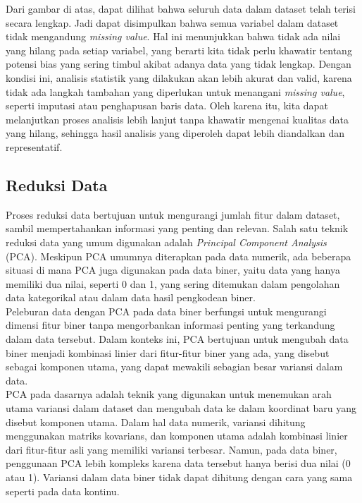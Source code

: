 \documentclass[english,12pt,a4paper,openany]{book}
\begin{document}
	Dari gambar di atas, dapat dilihat bahwa seluruh data dalam dataset telah terisi secara lengkap. Jadi dapat disimpulkan bahwa semua variabel dalam dataset tidak mengandung \textit{missing value}. Hal ini menunjukkan bahwa tidak ada nilai yang hilang pada setiap variabel, yang berarti kita tidak perlu khawatir tentang potensi bias yang sering timbul akibat adanya data yang tidak lengkap. Dengan kondisi ini, analisis statistik yang dilakukan akan lebih akurat dan valid, karena tidak ada langkah tambahan yang diperlukan untuk menangani \textit{missing value}, seperti imputasi atau penghapusan baris data. Oleh karena itu, kita dapat melanjutkan proses analisis lebih lanjut tanpa khawatir mengenai kualitas data yang hilang, sehingga hasil analisis yang diperoleh dapat lebih diandalkan dan representatif.
	
	
	\subsection{Reduksi Data}
	Proses reduksi data bertujuan untuk mengurangi jumlah fitur dalam dataset, sambil mempertahankan informasi yang penting dan relevan. Salah satu teknik reduksi data yang umum digunakan adalah \textit{Principal Component Analysis} (PCA). Meskipun PCA umumnya diterapkan pada data numerik, ada beberapa situasi di mana PCA juga digunakan pada data biner, yaitu data yang hanya memiliki dua nilai, seperti 0 dan 1, yang sering ditemukan dalam pengolahan data kategorikal atau dalam data hasil pengkodean biner.\\
	
	Peleburan data dengan PCA pada data biner berfungsi untuk mengurangi dimensi fitur biner tanpa mengorbankan informasi penting yang terkandung dalam data tersebut. Dalam konteks ini, PCA bertujuan untuk mengubah data biner menjadi kombinasi linier dari fitur-fitur biner yang ada, yang disebut sebagai komponen utama, yang dapat mewakili sebagian besar variansi dalam data.\\
	
	PCA pada dasarnya adalah teknik yang digunakan untuk menemukan arah utama variansi dalam dataset dan mengubah data ke dalam koordinat baru yang disebut komponen utama. Dalam hal data numerik, variansi dihitung menggunakan matriks kovarians, dan komponen utama adalah kombinasi linier dari fitur-fitur asli yang memiliki variansi terbesar. Namun, pada data biner, penggunaan PCA lebih kompleks karena data tersebut hanya berisi dua nilai (0 atau 1). Variansi dalam data biner tidak dapat dihitung dengan cara yang sama seperti pada data kontinu.\\
	
\end{document}
